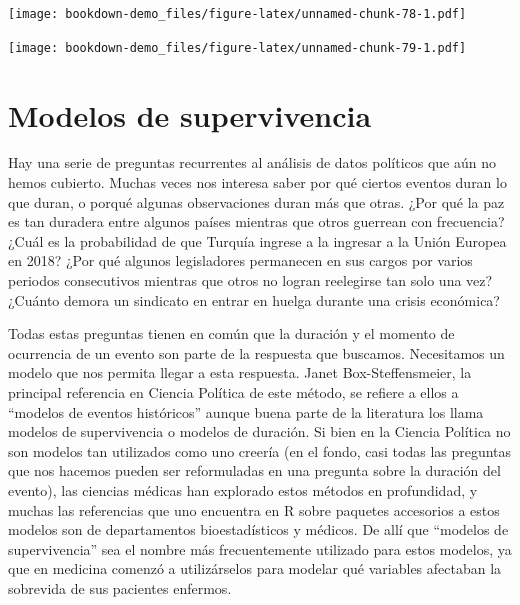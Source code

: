 \documentclass[]{book}
\newenvironment{Shaded}{\begin{snugshade}}{\end{snugshade}}
\newcommand{\KeywordTok}[1]{\textcolor[rgb]{0.13,0.29,0.53}{\textbf{#1}}}
\newcommand{\DataTypeTok}[1]{\textcolor[rgb]{0.13,0.29,0.53}{#1}}
\newcommand{\DecValTok}[1]{\textcolor[rgb]{0.00,0.00,0.81}{#1}}
\newcommand{\StringTok}[1]{\textcolor[rgb]{0.31,0.60,0.02}{#1}}
\newcommand{\OperatorTok}[1]{\textcolor[rgb]{0.81,0.36,0.00}{\textbf{#1}}}
\newcommand{\NormalTok}[1]{#1}
\begin{document}
\texttt{[image: bookdown-demo\_files/figure-latex/unnamed-chunk-78-1.pdf]}

\begin{Shaded}
\end{Shaded}

\texttt{[image: bookdown-demo\_files/figure-latex/unnamed-chunk-79-1.pdf]}

\chapter{Modelos de supervivencia}\label{modelos-de-supervivencia}

Hay una serie de preguntas recurrentes al análisis de datos políticos
que aún no hemos cubierto. Muchas veces nos interesa saber por qué
ciertos eventos duran lo que duran, o porqué algunas observaciones duran
más que otras. ¿Por qué la paz es tan duradera entre algunos países
mientras que otros guerrean con frecuencia? ¿Cuál es la probabilidad de
que Turquía ingrese a la ingresar a la Unión Europea en 2018? ¿Por qué
algunos legisladores permanecen en sus cargos por varios periodos
consecutivos mientras que otros no logran reelegirse tan solo una vez?
¿Cuánto demora un sindicato en entrar en huelga durante una crisis
económica?

Todas estas preguntas tienen en común que la duración y el momento de
ocurrencia de un evento son parte de la respuesta que buscamos.
Necesitamos un modelo que nos permita llegar a esta respuesta. Janet
Box-Steffensmeier, la principal referencia en Ciencia Política de este
método, se refiere a ellos a ``modelos de eventos históricos'' aunque
buena parte de la literatura los llama modelos de supervivencia o
modelos de duración. Si bien en la Ciencia Política no son modelos tan
utilizados como uno creería (en el fondo, casi todas las preguntas que
nos hacemos pueden ser reformuladas en una pregunta sobre la duración
del evento), las ciencias médicas han explorado estos métodos en
profundidad, y muchas las referencias que uno encuentra en R sobre
paquetes accesorios a estos modelos son de departamentos bioestadísticos
y médicos. De allí que ``modelos de supervivencia'' sea el nombre más
frecuentemente utilizado para estos modelos, ya que en medicina comenzó
a utilizárselos para modelar qué variables afectaban la sobrevida de sus
pacientes enfermos.
\end{document}
